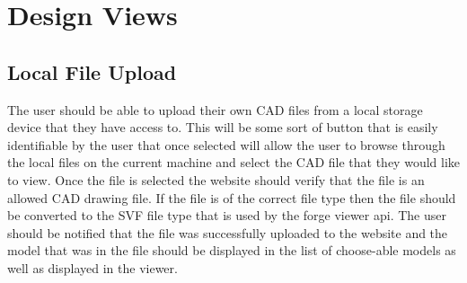 \documentclass[letterpaper, 10pt, draftclsnofoot, compsoc, onecolumn]{IEEEtran}
\begin{document}
\section{Design Views}

\subsection{Local File Upload}
	The user should be able to upload their own CAD files from a local storage device that they have access to. This will be some sort of button that is easily identifiable by the user that once selected will allow the user to browse through the local files on the current machine and select the CAD file that they would like to view. Once the file is selected the website should verify that the file is an allowed CAD drawing file. If the file is of the correct file type then the file should be converted to the SVF file type that is used by the forge viewer api. The user should be notified that the file was successfully uploaded to the website and the model that was in the file should be displayed in the list of choose-able models as well as displayed in the viewer. 
\end{document}
